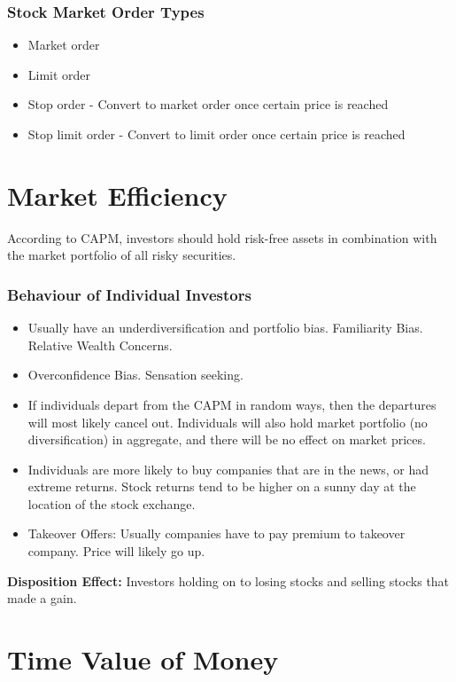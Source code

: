 \documentclass[english, 12pt]{article}
\begin{document}
\subsubsection*{Stock Market Order Types}
\begin{itemize}
\item Market order
\item Limit order 
\item Stop order - Convert to market order once certain price is reached
\item Stop limit order - Convert to limit order once certain price is reached
\end{itemize}

\section{Market Efficiency}
According to CAPM, investors should hold risk-free assets in combination with the market portfolio of all risky securities.
\subsubsection{Behaviour of Individual Investors}
\begin{itemize}
\item Usually have an underdiversification and portfolio bias. Familiarity Bias. Relative Wealth Concerns.
\item Overconfidence Bias. Sensation seeking.
\item If individuals depart from the CAPM in random ways, then the departures will most likely cancel out. Individuals will also hold market portfolio (no diversification) in aggregate, and there will be no effect on market prices.
\item Individuals are more likely to buy companies that are in the news, or had extreme returns. Stock returns tend to be higher on a sunny day at the location of the stock exchange.
\item Takeover Offers: Usually companies have to pay premium to takeover company. Price will likely go up.
\end{itemize}
\begin{defn}
\textbf{Disposition Effect:} Investors holding on to losing stocks and selling stocks that made a gain.
\end{defn}

\section{Time Value of Money}
\end{document}
